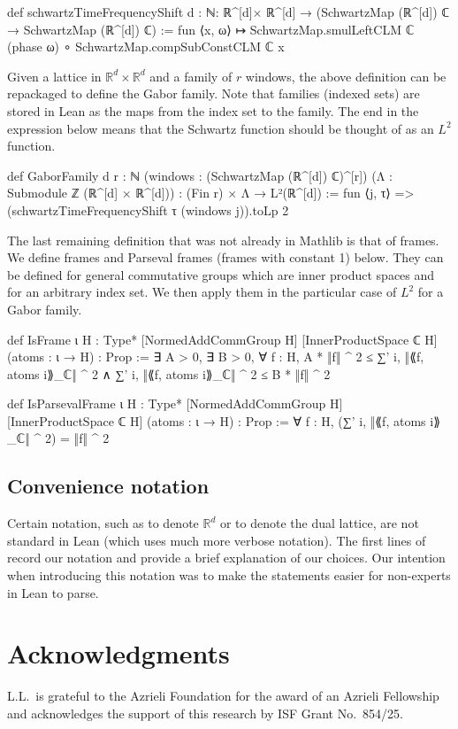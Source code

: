 \documentclass[reqno,a4paper,12pt]{amsart}
\numberwithin{equation}{section}
\newcommand\1{\mathds{1}}
\begin{document}
\begin{leancode}
def schwartzTimeFrequencyShift {d : ℕ}:
    ℝ^[d]× ℝ^[d] →  (SchwartzMap (ℝ^[d]) ℂ → SchwartzMap (ℝ^[d]) ℂ) :=
    fun ⟨x, ω⟩ ↦ SchwartzMap.smulLeftCLM ℂ (phase ω) ∘ 
                 SchwartzMap.compSubConstCLM ℂ x
\end{leancode}

 Given a lattice in $\mathbb R^d \times \mathbb R^d$ and a family of $r$ windows, the above definition can be repackaged to define the Gabor family. Note that families (indexed sets) are stored in Lean as the maps from the index set to the family. The  end in the expression below means that the Schwartz function should be thought of as an $L^2$ function.
\begin{leancode}
def GaborFamily {d r : ℕ} 
    (windows : (SchwartzMap (ℝ^[d]) ℂ)^[r])
    (Λ : Submodule ℤ (ℝ^[d] × ℝ^[d]))  :
    (Fin r) × Λ  →  L²(ℝ^[d]) :=
  fun ⟨j, τ⟩ => (schwartzTimeFrequencyShift τ (windows j)).toLp 2
\end{leancode}

The last remaining definition that was not already in Mathlib is that of frames. We define frames and Parseval frames (frames with constant 1) below. They can be defined for general commutative groups  which are inner product spaces and for an arbitrary index set. We then apply them in the particular case of $L^2$ for a Gabor family.

\begin{leancode}
def IsFrame {ι H : Type*} [NormedAddCommGroup H]  [InnerProductSpace ℂ H] 
    (atoms : ι → H) : Prop :=
  ∃ A > 0, ∃ B > 0, ∀ f : H,
      A * ‖f‖ ^ 2 ≤ ∑' i, ‖⟪f, atoms i⟫_ℂ‖ ^ 2 ∧
      ∑' i, ‖⟪f, atoms i⟫_ℂ‖ ^ 2 ≤ B * ‖f‖ ^ 2

def IsParsevalFrame {ι H : Type*} [NormedAddCommGroup H] [InnerProductSpace ℂ H]
    (atoms : ι → H) : Prop :=
  ∀ f : H, (∑' i, ‖⟪f, atoms i⟫_ℂ‖ ^ 2) = ‖f‖ ^ 2
\end{leancode}

\subsection{Convenience notation}
Certain notation, such as  to denote $\mathbb R^d$ or to denote the dual lattice, are not standard in Lean (which uses much more verbose notation). The first lines of  record our notation and provide a brief explanation of our choices. Our intention when introducing this notation was to make the statements easier for non-experts in Lean to parse.


\section*{Acknowledgments}

L.L.~is grateful to the Azrieli Foundation for the award of an Azrieli Fellowship and acknowledges the support of this research by ISF Grant No.~854/25. 




\end{document}
